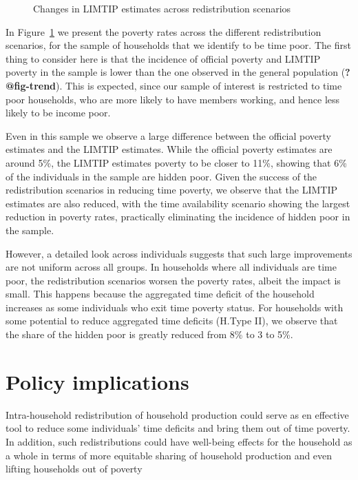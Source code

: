 \documentclass[
  11pt,
]{article}
\begin{document}
\begin{figure}[H]


\caption{\label{fig-limtip}Changes in LIMTIP estimates across
redistribution scenarios}

\end{figure}%

In Figure~\ref{fig-limtip} we present the poverty rates across the
different redistribution scenarios, for the sample of households that we
identify to be time poor. The first thing to consider here is that the
incidence of official poverty and LIMTIP poverty in the sample is lower
than the one observed in the general population (\textbf{?@fig-trend}).
This is expected, since our sample of interest is restricted to time
poor households, who are more likely to have members working, and hence
less likely to be income poor.

Even in this sample we observe a large difference between the official
poverty estimates and the LIMTIP estimates. While the official poverty
estimates are around 5\%, the LIMTIP estimates poverty to be closer to
11\%, showing that 6\% of the individuals in the sample are hidden poor.
Given the success of the redistribution scenarios in reducing time
poverty, we observe that the LIMTIP estimates are also reduced, with the
time availability scenario showing the largest reduction in poverty
rates, practically eliminating the incidence of hidden poor in the
sample.

However, a detailed look across individuals suggests that such large
improvements are not uniform across all groups. In households where all
individuals are time poor, the redistribution scenarios worsen the
poverty rates, albeit the impact is small. This happens because the
aggregated time deficit of the household increases as some individuals
who exit time poverty status. For households with some potential to
reduce aggregated time deficits (H.Type II), we observe that the share
of the hidden poor is greatly reduced from 8\% to 3 to 5\%.

\section{Policy implications}\label{policy-implications}

Intra-household redistribution of household production could serve as en
effective tool to reduce some individuals' time deficits and bring them
out of time poverty. In addition, such redistributions could have
well-being effects for the household as a whole in terms of more
equitable sharing of household production and even lifting households
out of poverty
\end{document}
